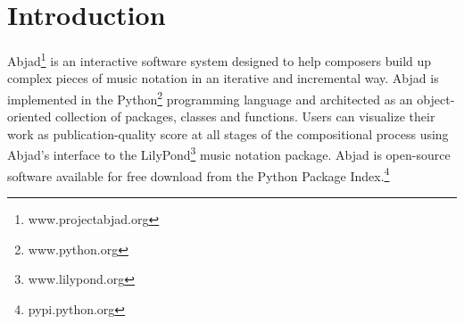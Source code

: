 \section{Introduction}\label{sec:introduction}

\begin{comment}
1. Changed "composers, music theorists and musicologists" to just "composers". How do we feel about this?
\end{comment}

Abjad\footnote{www.projectabjad.org} is an interactive software system designed
to help composers build up complex pieces of music notation in an iterative and
incremental way. Abjad is implemented in the Python\footnote{www.python.org}
programming language and architected as an object-oriented collection of
packages, classes and functions. Users can visualize their work as
publication-quality score at all stages of the compositional process using
Abjad's interface to the LilyPond\footnote{www.lilypond.org} music notation
package. Abjad is open-source software available for free download from the
Python Package Index.\footnote{pypi.python.org}

\begin{comment}
The current version of Abjad implements 491 public classes and 324 public
functions.
\end{comment}
